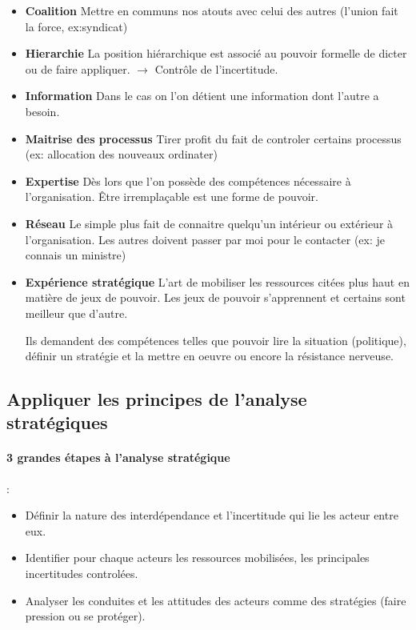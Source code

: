 \documentclass[11pt]{article} %
\begin{document}
\begin{itemize}

 \item \textbf{Coalition} Mettre en communs nos atouts avec celui des
 autres (l'union fait la force, ex:syndicat)

 \item \textbf{Hierarchie} La position hiérarchique est associé au
 pouvoir formelle de dicter ou de faire appliquer. $\to$ Contrôle de
 l'incertitude.

 \item \textbf{Information} Dans le cas on l'on détient une information
dont l'autre a besoin.

 \item \textbf{Maitrise des processus} Tirer profit du fait de controler
 certains processus (ex: allocation des nouveaux ordinater)

 \item \textbf{Expertise} Dès lors que l'on possède des compétences
 nécessaire à l'organisation. Être irremplaçable est une forme de
 pouvoir.

 \item \textbf{Réseau} Le simple plus fait de connaitre quelqu'un
 intérieur ou extérieur à l'organisation. Les autres doivent passer
 par moi pour le contacter (ex: je connais un ministre)

 \item \textbf{Expérience stratégique} L'art de mobiliser les
 ressources citées plus haut en matière de jeux de pouvoir. Les
 jeux de pouvoir s'apprennent et certains sont meilleur que d'autre.

 Ils demandent des compétences telles que pouvoir lire la situation
 (politique), définir un stratégie et la mettre en oeuvre ou encore
 la résistance nerveuse.
\end{itemize}

\subsection{Appliquer les principes de l'analyse stratégiques}

\paragraph{3 grandes étapes à l'analyse stratégique} :

\begin{itemize}
 \item Définir la nature des interdépendance et l'incertitude qui lie
les acteur entre eux.

 \item Identifier pour chaque acteurs les ressources mobilisées, les
 principales incertitudes controlées.

 \item Analyser les conduites et les attitudes des acteurs comme des
 stratégies (faire pression ou se protéger).
\end{itemize}
\end{document}
